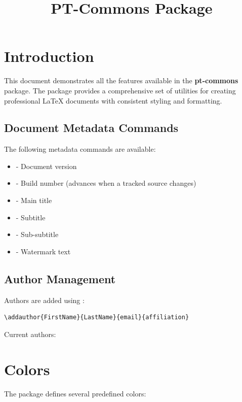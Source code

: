 \documentclass[11pt,letterpaper]{article}
\title{PT-Commons Package}
\begin{document}
\section{Introduction}

This document demonstrates all the features available in the \textbf{pt-commons} package. The package provides a comprehensive set of utilities for creating professional LaTeX documents with consistent styling and formatting.

\subsection{Document Metadata Commands}

The following metadata commands are available:

\begin{itemize}
    \item {} - Document version
    \item {} - Build number (advances when a tracked source changes)
    \item {} - Main title
    \item {} - Subtitle
    \item {} - Sub-subtitle
    \item {} - Watermark text
\end{itemize}

\subsection{Author Management}

Authors are added using :

\begin{verbatim}
\addauthor{FirstName}{LastName}{email}{affiliation}
\end{verbatim}

Current authors: \titleauthorsnames{, }

\section{Colors}

The package defines several predefined colors:
\end{document}
